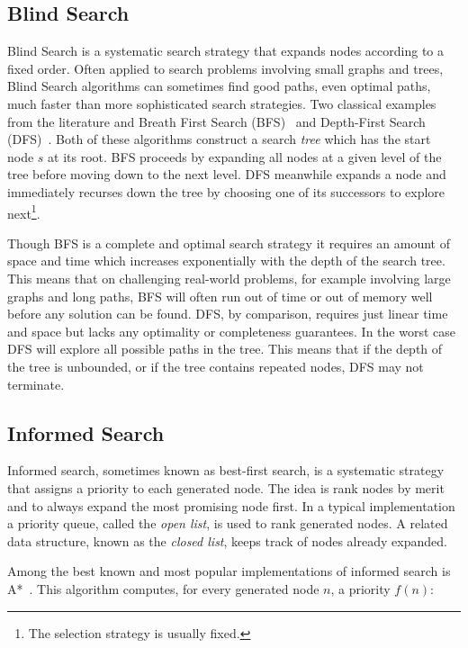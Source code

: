 \subsection{Blind Search}
\label{cha::lit::search::blind}
Blind Search is a systematic search strategy that expands nodes according to 
a fixed order. Often applied to search problems involving small graphs and trees, 
Blind Search algorithms can sometimes find good paths, even optimal paths, much 
faster than more sophisticated search strategies.
 Two classical examples from the literature and Breath First Search 
(BFS)~\citep{moore59} and Depth-First Search (DFS)~\citep{russel03}.  Both of
these algorithms construct a search \emph{tree} which has the start node $s$
at its root. BFS proceeds by expanding all nodes at a given level of the tree
before moving down to the next level. DFS meanwhile expands a node and
immediately recurses down the tree by choosing one of its successors to
explore next\footnote{The selection strategy is usually fixed.}.

Though BFS is a complete and optimal search strategy it requires an amount of 
space and time which increases exponentially with the
depth of the search tree. This means that on challenging real-world problems,
for example involving large graphs and long paths, BFS will often run out 
of time or out of memory well before any solution can be found.  
DFS, by comparison, requires just linear time and
space but lacks any optimality or completeness guarantees. In the worst case
DFS will explore all possible paths in the tree. This means that if the depth
of the tree is unbounded, or if the tree contains repeated nodes, DFS may not
terminate. 

\subsection{Informed Search}
\label{cha::lit::search::informed}
Informed search, sometimes known as best-first search, is a systematic strategy
that assigns a priority to each generated node. The idea is rank nodes by merit 
and to always expand the most promising node first.
In a typical implementation a priority queue, called the 
\emph{open list}, is used to rank generated nodes. A related data structure, 
known as the \emph{closed list}, keeps track of nodes already expanded.

Among the best known and most popular implementations of informed search is 
A{*}~\citep{hart68}. This algorithm computes, for every generated node $n$, a 
priority $f(n)$:

